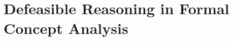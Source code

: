 \chapter{Defeasible Reasoning in Formal Concept Analysis}
\label{chapter:defeasible-reasoning-in-fca}